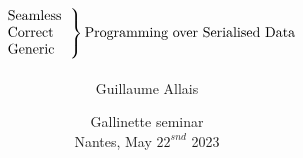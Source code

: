 \documentclass{beamer}
\title{
  \[
  \left.
    \begin{tabular}{l}
      Seamless \\
      Correct \\
      Generic
    \end{tabular}
  \right\}
  \text{Programming over Serialised Data}
  \]}
\author{Guillaume Allais}
\institute{University of Strathclyde \\ Glasgow, UK}
\date{Gallinette seminar \\ Nantes, May $22^{snd}$ 2023}
\begin{document}
\begin{frame}
  \maketitle
\end{frame}








\end{document}

